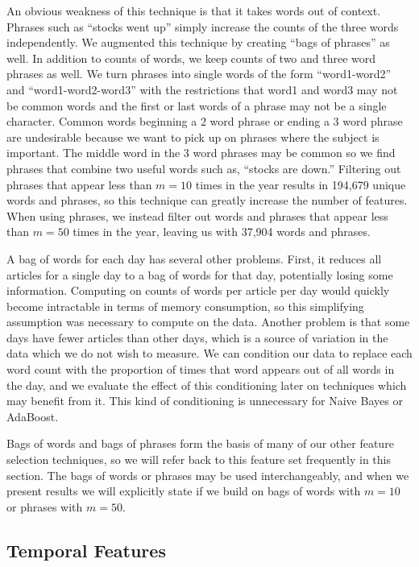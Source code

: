 \documentclass[10pt, twocolumn]{article}
\begin{document}
An obvious weakness of this technique is that it takes words out of context. Phrases such as ``stocks went up'' simply increase the counts of the three words independently. We augmented this technique by creating ``bags of phrases'' as well. In addition to counts of words, we keep counts of two and three word phrases
as well. We turn phrases into single words of the form ``word1-word2'' and ``word1-word2-word3'' with the restrictions that word1 and word3 may not be common words and the first or last words of a phrase may not be a single character. Common words beginning a 2 word phrase or ending a 3 word phrase are undesirable because we want to pick up on phrases where the subject is important. The middle word in the 3 word phrases may be common so we find phrases that combine two useful words such as, ``stocks are down.'' Filtering out phrases that appear less than $m = 10$ times in the year results in 194,679 unique words and phrases, so this technique can greatly increase the number of features. When using phrases, we instead filter out words and phrases that appear less than $m = 50$ times in the year, leaving us with 37,904 words and phrases.

A bag of words for each day has several other problems. First, it reduces all articles for a single day to a bag of words for that day, potentially losing some information. Computing on counts of words per article per day would quickly become intractable in terms of memory consumption, so this simplifying assumption was necessary to compute on the data. Another problem is that some days have fewer articles than other days, which is a source of variation in the data which we do not wish to measure. We can condition our data to replace each word count with the proportion of times that word appears out of all words in the day, and we evaluate the effect of this conditioning later on techniques which may benefit from it. This kind of conditioning is unnecessary for Naive Bayes or AdaBoost.

Bags of words and bags of phrases form the basis of many of our other feature selection techniques, so we will refer back to this feature set frequently in this section. The bags of words or phrases may be used interchangeably, and when we present results we will explicitly state if we build on bags of words with $m=10$ or phrases with $m=50$.

\subsection{Temporal Features}
\end{document}
